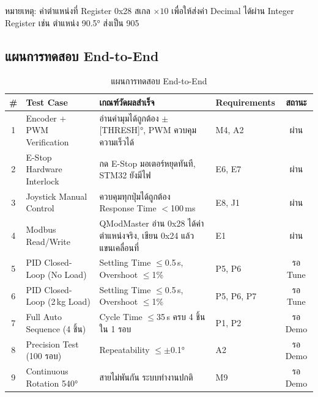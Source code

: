 หมายเหตุ: ค่าตำแหน่งที่ Register 0x28 สเกล $\times 10$
เพื่อให้ส่งค่า Decimal ได้ผ่าน Integer Register
เช่น ตำแหน่ง 90.5° ส่งเป็น 905

\subsection{แผนการทดสอบ End-to-End}
\label{subsec:end_to_end_test_plan}

\begin{table}[H]
  \centering
  \caption{แผนการทดสอบ End-to-End}
  \label{tab:e2e_plan}
  \begin{tabular}{clp{4.5cm}lc}
    \toprule
    \# & Test Case & เกณฑ์วัดผลสำเร็จ & Requirements & สถานะ \\
    \midrule
    1 & Encoder + PWM Verification
      & อ่านค่ามุมได้ถูกต้อง $\pm$[THRESH]°,
        PWM ควบคุมความเร็วได้
      & M4, A2
      & ผ่าน \\
    2 & E-Stop Hardware Interlock
      & กด E-Stop มอเตอร์หยุดทันที,
        STM32 ยังมีไฟ
      & E6, E7
      & ผ่าน \\
    3 & Joystick Manual Control
      & ควบคุมทุกปุ่มได้ถูกต้อง
        Response Time $<$100\,ms
      & E8, J1
      & ผ่าน \\
    4 & Modbus Read/Write
      & QModMaster อ่าน 0x28 ได้ค่าตำแหน่งจริง,
        เขียน 0x24 แล้วแขนเคลื่อนที่
      & E1
      & ผ่าน \\
    5 & PID Closed-Loop (No Load)
      & Settling Time $\leq$0.5\,s,
        Overshoot $\leq$1\%
      & P5, P6
      & รอ Tune \\
    6 & PID Closed-Loop (2\,kg Load)
      & Settling Time $\leq$0.5\,s,
        Overshoot $\leq$1\%
      & P5, P6, P7
      & รอ Tune \\
    7 & Full Auto Sequence (4 ชิ้น)
      & Cycle Time $\leq$35\,s
        ครบ 4 ชิ้นใน 1 รอบ
      & P1, P2
      & รอ Demo \\
    8 & Precision Test (100 รอบ)
      & Repeatability $\leq \pm$0.1°
      & A2
      & รอ Demo \\
    9 & Continuous Rotation 540°
      & สายไม่พันกัน ระบบทำงานปกติ
      & M9
      & รอ Demo \\
    \bottomrule
  \end{tabular}
\end{table}